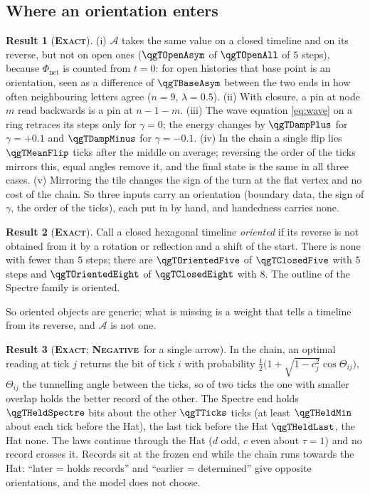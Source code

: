 \documentclass[11pt]{article}
\newcommand{\exact}{\textbf{\textsc{Exact}}}
\newcommand{\negres}{\textbf{\textsc{Negative}}}
\theoremstyle{definition}
\newtheorem{result}{Result}
\begin{document}
\subsection{Where an orientation enters}\label{sec:staged-arrow}
\begin{result}[\exact]\label{res:audit}
(i) $\mathcal{A}$ takes the same value on a closed timeline and on its reverse, but not on open ones ($\qgTOpenAsym$ of $\qgTOpenAll$ of $5$ steps), because $\Phi_{\mathrm{net}}$ is counted from $t=0$: for open histories that base point is an orientation, seen as a difference of $\qgTBaseAsym$ between the two ends in how often neighbouring letters agree ($n=9$, $\lambda=0.5$). (ii) With closure, a pin at node $m$ read backwards is a pin at $n-1-m$. (iii) The wave equation \eqref{eq:wave} on a ring retraces its steps only for $\gamma=0$; the energy changes by $\qgTDampPlus$ for $\gamma=+0.1$ and $\qgTDampMinus$ for $\gamma=-0.1$. (iv) In the chain a single flip lies $\qgTMeanFlip$ ticks after the middle on average; reversing the order of the ticks mirrors this, equal angles remove it, and the final state is the same in all three cases. (v) Mirroring the tile changes the sign of the turn at the flat vertex and no cost of the chain. So three inputs carry an orientation (boundary data, the sign of $\gamma$, the order of the ticks), each put in by hand, and handedness carries none.
\end{result}
\begin{result}[\exact]\label{res:census}
Call a closed hexagonal timeline \emph{oriented} if its reverse is not obtained from it by a rotation or reflection and a shift of the start. There is none with fewer than $5$ steps; there are $\qgTOrientedFive$ of $\qgTClosedFive$ with $5$ steps and $\qgTOrientedEight$ of $\qgTClosedEight$ with $8$. The outline of the Spectre family is oriented.
\end{result}
So oriented objects are generic; what is missing is a weight that tells a timeline from its reverse, and $\mathcal{A}$ is not one.
\begin{result}[\exact; \negres\ for a single arrow]\label{res:records}
In the chain, an optimal reading at tick $j$ returns the bit of tick $i$ with probability $\tfrac12\bigl(1+\sqrt{1-c_j^2}\cos\Theta_{ij}\bigr)$, $\Theta_{ij}$ the tunnelling angle between the ticks, so of two ticks the one with smaller overlap holds the better record of the other. The Spectre end holds $\qgTHeldSpectre$ bits about the other $\qgTTicks$ ticks (at least $\qgTHeldMin$ about each tick before the Hat), the last tick before the Hat $\qgTHeldLast$, the Hat none. The laws continue through the Hat ($d$ odd, $c$ even about $\tau=1$) and no record crosses it. Records sit at the frozen end while the chain runs towards the Hat: ``later = holds records'' and ``earlier = determined'' give opposite orientations, and the model does not choose.
\end{result}
\end{document}
